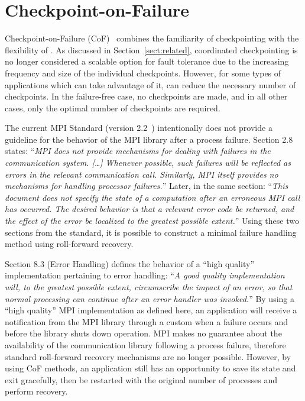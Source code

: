 \section{Checkpoint-on-Failure}\label{sect:cof}

Checkpoint-on-Failure (CoF)~\cite{Bland:2012tw} combines the familiarity of
checkpointing with the flexibility of \abft. As discussed in
Section~\ref{sect:related}, coordinated checkpointing is no longer considered a
scalable option for fault tolerance due to the increasing frequency and size of
the individual checkpoints. However, for some types of applications which can
take advantage of it, \cof can reduce the necessary number of checkpoints. In
the failure-free case, no checkpoints are made, and in all other cases, only the
optimal number of checkpoints are required.


The current MPI Standard (version 2.2~\cite{MPI22}) intentionally does not provide a
guideline for the behavior of the MPI library after a process failure. Section
2.8 states: ``\emph{MPI does not provide mechanisms for dealing with failures in
the communication system. [\ldots] Whenever possible, such failures will be
reflected as errors in the relevant communication call. Similarly, MPI itself
provides no mechanisms for handling processor failures.}'' Later, in the same
section: ``\emph{This document does not specify the state of a computation after
an erroneous MPI call has occurred. The desired behavior is that a relevant
error code be returned, and the effect of the error be localized to the greatest
possible extent.}'' Using these two sections from the standard, it is possible
to construct a minimal failure handling method using roll-forward recovery.

Section 8.3 (Error Handling) defines the behavior of a ``high quality''
implementation pertaining to error handling: ``\emph{A good quality
implementation will, to the greatest possible extent, circumscribe the impact of
an error, so that normal processing can continue after an error handler was
invoked.}'' By using a ``high quality'' MPI implementation as defined here, an
application will receive a notification from the MPI library through a custom
 when a failure occurs and before the library shuts
down operation. MPI makes no guarantee about the availability of the
communication library following a process failure, therefore standard
roll-forward recovery mechanisms are no longer possible. However, by using CoF
methods, an application still has an opportunity to save its state and exit
gracefully, then be restarted with the original number of processes and perform
recovery.

